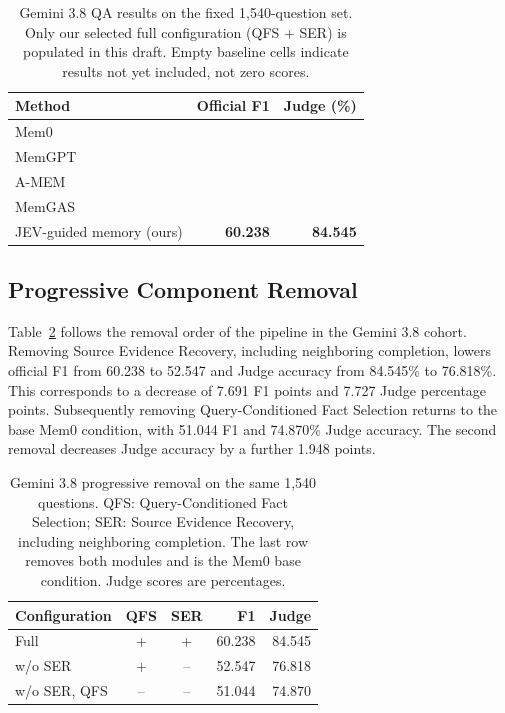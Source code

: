 \documentclass[11pt]{article}
\newcommand{\method}{JEV-guided memory}
\newcommand{\qfs}{\textsc{QFS}}
\newcommand{\ser}{\textsc{SER}}
\begin{document}
\begin{table}[t]
\centering
\small
\begin{tabular}{lrr}
\toprule
Method & Official F1 & Judge (\%)\\
\midrule
Mem0 & & \\
MemGPT & & \\
A-MEM & & \\
MemGAS & & \\
\midrule
\method{} (ours) & \textbf{60.238} & \textbf{84.545}\\
\bottomrule
\end{tabular}
\caption{Gemini 3.8 QA results on the fixed 1,540-question set. Only our selected full configuration (\qfs{} + \ser{}) is populated in this draft. Empty baseline cells indicate results not yet included, not zero scores.}
\label{tab:main}
\end{table}

\subsection{Progressive Component Removal}
Table~\ref{tab:removal} follows the removal order of the pipeline in the Gemini 3.8 cohort. Removing Source Evidence Recovery, including neighboring completion, lowers official F1 from 60.238 to 52.547 and Judge accuracy from 84.545\% to 76.818\%. This corresponds to a decrease of 7.691 F1 points and 7.727 Judge percentage points. Subsequently removing Query-Conditioned Fact Selection returns to the base Mem0 condition, with 51.044 F1 and 74.870\% Judge accuracy. The second removal decreases Judge accuracy by a further 1.948 points.

\begin{table}[t]
\centering
\small
\begin{tabular}{lccrr}
\toprule
Configuration & \qfs{} & \ser{} & F1 & Judge\\
\midrule
Full & + & + & 60.238 & 84.545\\
w/o \ser{} & + & -- & 52.547 & 76.818\\
w/o \ser{}, \qfs{} & -- & -- & 51.044 & 74.870\\
\bottomrule
\end{tabular}
\caption{Gemini 3.8 progressive removal on the same 1,540 questions. \qfs{}: Query-Conditioned Fact Selection; \ser{}: Source Evidence Recovery, including neighboring completion. The last row removes both modules and is the Mem0 base condition. Judge scores are percentages.}
\label{tab:removal}
\end{table}
\end{document}
